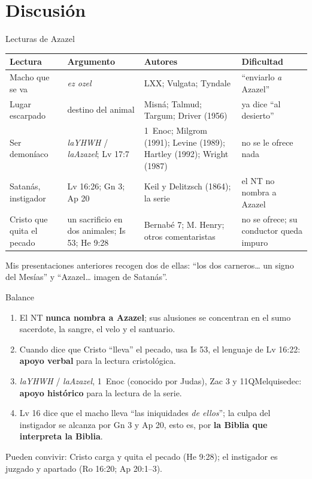 \documentclass[hyperref={bookmarks=false},aspectratio=169]{beamer}
\newcommand{\destacar}[1]{\textbf{\textcolor{tierraroja}{#1}}}
\begin{document}
\section{Discusión}

\begin{frame}{Lecturas de Azazel}
\tiny\renewcommand{\arraystretch}{1.15}
\begin{tabular}{@{}L{2.4cm}L{3.6cm}L{3.5cm}L{2.4cm}@{}}
\toprule
\textbf{Lectura} & \textbf{Argumento} & \textbf{Autores} & \textbf{Dificultad} \\ \midrule
Macho que se va & \emph{ez ozel} & LXX; Vulgata; Tyndale & ``enviarlo \emph{a} Azazel'' \\
Lugar escarpado & destino del animal & Misná; Talmud; Targum; Driver (1956) & ya dice ``al desierto'' \\
Ser demoníaco & \emph{laYHWH} / \emph{laAzazel}; Lv 17:7 & 1~Enoc; Milgrom (1991); Levine (1989); Hartley (1992); Wright (1987) & no se le ofrece nada \\
Satanás, instigador & Lv 16:26; Gn 3; Ap 20 & Keil y Delitzsch (1864); la serie & el NT no nombra a Azazel \\
Cristo que quita el pecado & un sacrificio en dos animales; Is 53; He 9:28 & Bernabé 7; M. Henry; otros comentaristas & no se ofrece; su conductor queda impuro \\
\bottomrule
\end{tabular}\par\medskip
\scriptsize Mis presentaciones anteriores recogen dos de ellas: ``los dos carneros\ldots{} un signo del Mesías'' y ``Azazel\ldots{} imagen de Satanás''.
\end{frame}

\begin{frame}{Balance}
\small
\begin{enumerate}\setlength{\itemsep}{2pt}
\item El NT \destacar{nunca nombra a Azazel}; sus alusiones se concentran en el sumo sacerdote, la sangre, el velo y el santuario.
\item Cuando dice que Cristo ``lleva'' el pecado, usa Is 53, el lenguaje de Lv 16:22: \destacar{apoyo verbal} para la lectura cristológica.
\item \emph{laYHWH} / \emph{laAzazel}, 1~Enoc (conocido por Judas), Zac 3 y 11QMelquisedec: \destacar{apoyo histórico} para la lectura de la serie.
\item Lv 16 dice que el macho lleva ``las iniquidades \emph{de ellos}''; la culpa del instigador se alcanza por Gn 3 y Ap 20, esto es, por \destacar{la Biblia que interpreta la Biblia}.
\end{enumerate}
\scriptsize Pueden convivir: Cristo carga y quita el pecado (He 9:28); el instigador es juzgado y apartado (Ro 16:20; Ap 20:1--3).
\end{frame}
\end{document}
